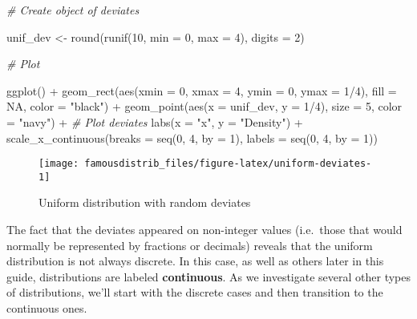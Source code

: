 \documentclass[
]{article}
\newenvironment{Shaded}{\begin{snugshade}}{\end{snugshade}}
\newcommand{\AttributeTok}[1]{\textcolor[rgb]{0.77,0.63,0.00}{#1}}
\newcommand{\CommentTok}[1]{\textcolor[rgb]{0.56,0.35,0.01}{\textit{#1}}}
\newcommand{\ConstantTok}[1]{\textcolor[rgb]{0.00,0.00,0.00}{#1}}
\newcommand{\DecValTok}[1]{\textcolor[rgb]{0.00,0.00,0.81}{#1}}
\newcommand{\FunctionTok}[1]{\textcolor[rgb]{0.00,0.00,0.00}{#1}}
\newcommand{\NormalTok}[1]{#1}
\newcommand{\OtherTok}[1]{\textcolor[rgb]{0.56,0.35,0.01}{#1}}
\newcommand{\SpecialCharTok}[1]{\textcolor[rgb]{0.00,0.00,0.00}{#1}}
\newcommand{\StringTok}[1]{\textcolor[rgb]{0.31,0.60,0.02}{#1}}
\begin{document}
\begin{Shaded}
\begin{Highlighting}[]
\CommentTok{\# Create object of deviates}

\NormalTok{unif\_dev }\OtherTok{\textless{}{-}} \FunctionTok{round}\NormalTok{(}\FunctionTok{runif}\NormalTok{(}\DecValTok{10}\NormalTok{, }\AttributeTok{min =} \DecValTok{0}\NormalTok{, }\AttributeTok{max =} \DecValTok{4}\NormalTok{), }\AttributeTok{digits =} \DecValTok{2}\NormalTok{)}

\CommentTok{\# Plot}

\FunctionTok{ggplot}\NormalTok{() }\SpecialCharTok{+}
  \FunctionTok{geom\_rect}\NormalTok{(}\FunctionTok{aes}\NormalTok{(}\AttributeTok{xmin =} \DecValTok{0}\NormalTok{, }\AttributeTok{xmax =} \DecValTok{4}\NormalTok{, }\AttributeTok{ymin =} \DecValTok{0}\NormalTok{, }\AttributeTok{ymax =} \DecValTok{1}\SpecialCharTok{/}\DecValTok{4}\NormalTok{), }
            \AttributeTok{fill =} \ConstantTok{NA}\NormalTok{,}
            \AttributeTok{color =} \StringTok{"black"}\NormalTok{) }\SpecialCharTok{+}
  \FunctionTok{geom\_point}\NormalTok{(}\FunctionTok{aes}\NormalTok{(}\AttributeTok{x =}\NormalTok{ unif\_dev, }\AttributeTok{y =} \DecValTok{1}\SpecialCharTok{/}\DecValTok{4}\NormalTok{), }\AttributeTok{size =} \DecValTok{5}\NormalTok{, }\AttributeTok{color =} \StringTok{"navy"}\NormalTok{) }\SpecialCharTok{+} \CommentTok{\# Plot deviates}
  \FunctionTok{labs}\NormalTok{(}\AttributeTok{x =} \StringTok{"x"}\NormalTok{, }\AttributeTok{y =} \StringTok{"Density"}\NormalTok{) }\SpecialCharTok{+}
  \FunctionTok{scale\_x\_continuous}\NormalTok{(}\AttributeTok{breaks =} \FunctionTok{seq}\NormalTok{(}\DecValTok{0}\NormalTok{, }\DecValTok{4}\NormalTok{, }\AttributeTok{by =} \DecValTok{1}\NormalTok{), }\AttributeTok{labels =} \FunctionTok{seq}\NormalTok{(}\DecValTok{0}\NormalTok{, }\DecValTok{4}\NormalTok{, }\AttributeTok{by =} \DecValTok{1}\NormalTok{))}
\end{Highlighting}
\end{Shaded}

\begin{figure}

{\centering \texttt{[image: famousdistrib\_files/figure-latex/uniform-deviates-1]} 

}

\caption{Uniform distribution with random deviates}\label{fig:uniform-deviates}
\end{figure}

The fact that the deviates appeared on non-integer values (i.e.~those that would normally be represented by fractions or decimals) reveals that the uniform distribution is not always discrete. In this case, as well as others later in this guide, distributions are labeled \textbf{continuous}. As we investigate several other types of distributions, we'll start with the discrete cases and then transition to the continuous ones.
\end{document}
